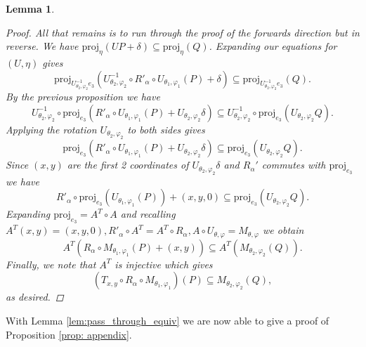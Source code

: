 \documentclass[a4paper]{amsart}
\newtheorem{lem}[thm]{Lemma}
\renewcommand{\phi}{\varphi}
\theoremstyle{remark}
\begin{document}
\begin{lem}
\begin{proof}
All that remains is to run through the proof of the forwards direction but in reverse. We have $\textrm{proj}_\eta(UP+\delta)\subseteq \textrm{proj}_\eta(Q)$. Expanding our equations for $(U,\eta)$ gives $$\textrm{proj}_{U_{\theta_2,\phi_2}^{-1}e_3}(U_{\theta_2,\phi_2}^{-1}\circ R'_\alpha \circ U_{\theta_1,\phi_1}(P)+\delta)\subseteq \textrm{proj}_{U_{\theta_2,\phi_2}^{-1}e_3}(Q).$$ By the previous proposition we have $$U_{\theta_2,\phi_2}^{-1}\circ \textrm{proj}_{e_3}( R'_\alpha \circ U_{\theta_1,\phi_1}(P)+U_{\theta_2,\phi_2}\delta)\subseteq U_{\theta_2,\phi_2}^{-1}\circ \textrm{proj}_{e_3}(U_{\theta_2,\phi_2}Q).$$ Applying the rotation $U_{\theta_2,\phi_2}$ to both sides gives $$\textrm{proj}_{e_3}( R'_\alpha \circ U_{\theta_1,\phi_1}(P)+U_{\theta_2,\phi_2}\delta)\subseteq \textrm{proj}_{e_3}(U_{\theta_2,\phi_2}Q).$$ Since $(x,y)$ are the first 2 coordinates of $U_{\theta_2,\phi_2}\delta$ and $R_\alpha'$ commutes with $\textrm{proj}_{e_3}$ we have $$R'_\alpha \circ \textrm{proj}_{e_3}(U_{\theta_1,\phi_1}(P))+(x,y,0)\subseteq \textrm{proj}_{e_3}(U_{\theta_2,\phi_2}Q).$$ Expanding $\textrm{proj}_{e_3}=A^T\circ A$ and recalling $A^T(x,y)=(x,y,0),R'_\alpha\circ A^T=A^T\circ R_\alpha ,A\circ U_{\theta,\phi}=M_{\theta,\phi}$ we obtain $$A^T(R_\alpha \circ M_{\theta_1,\phi_1}(P)+(x,y))\subseteq A^T(M_{\theta_2,\phi_2}(Q)).$$ Finally, we note that $A^T$ is injective which gives $$(T_{x,y}\circ R_\alpha\circ M_{\theta_1,\phi_1})(P)\subseteq M_{\theta_2,\phi_2}(Q),$$ as desired.
\end{proof}
\end{lem}
\noindent
With Lemma \ref{lem:pass_through_equiv} we are now able to give a proof of Proposition \ref{prop: appendix}.
\end{document}
